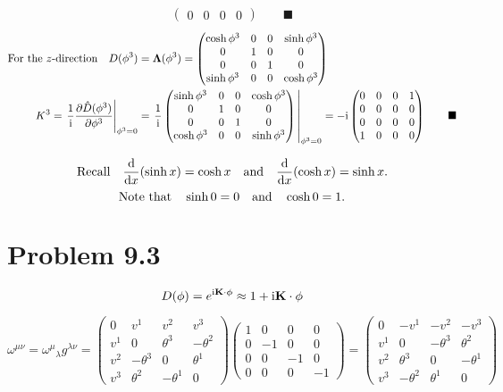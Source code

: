 \documentclass{article}
\begin{document}
\begin{align*}
\begin{pmatrix}
		0&0&0&0
		\end{pmatrix}\qquad\blacksquare
\end{align*}\begin{align*}
\qq*{For the $z$-direction}D(\phi^3)&=\vb{\Lambda}(\phi^3)=\begin{pmatrix}
\cosh{\phi^3}&0&0&\sinh{\phi^3}\\
0&1 & 0&0 \\ 
0 & 0&1&0\\
\sinh{\phi^3}&0&0&\cosh{\phi^3}
\end{pmatrix}\\
K^3=\eval{\frac{1}{\text{i}}\pdv{\hat{D}(\phi^3)}{\phi^3}}_{\phi^3=0}&=\eval{\frac{1}{\text{i}}\begin{pmatrix}
		\sinh{\phi^3}&0&0&\cosh{\phi^3}\\
0&1 & 0&0 \\ 
0 & 0&1&0\\
\cosh{\phi^3}&0&0&\sinh{\phi^3}
		\end{pmatrix}}_{\phi^3=0}=-\text{i}\begin{pmatrix}
		0&0&0&1\\
		0 & 0&0&0\\
		0&0&0&0 \\
		1&0 & 0&0 
		\end{pmatrix}\qquad\blacksquare
\end{align*}

\[\qq*{Recall}\dv{x}(\sinh x)=\cosh x\qand\dv{x}(\cosh x)=\sinh x.\]
\[\qq*{Note that}\sinh 0=0\qand\cosh 0=1.\]



\section*{Problem 9.3}
\[D(\vb{\phi})=e^{\text{i}\vb{K}\cdot\vb{\phi}}\approx 1+\text{i}\vb{K}\cdot\vb{\phi}
\]




\[\omega^{\mu\nu}={\omega^\mu}_\lambda g^{\lambda\nu}=\begin{pmatrix}0&v^1&v^2&v^3\\v^1&0&\theta^3&-\theta^2\\v^2&-\theta^3&0&\theta^1\\v^3&\theta^2&-\theta^1&0\end{pmatrix}
\begin{pmatrix}1&0&0&0\\0&-1&0&0\\0&0&-1&0\\0&0&0&-1\end{pmatrix}=
\begin{pmatrix}0&-v^1&-v^2&-v^3\\v^1&0&-\theta^3&\theta^2\\v^2&\theta^3&0&-\theta^1\\v^3&-\theta^2&\theta^1&0\end{pmatrix}\]
\end{document}
